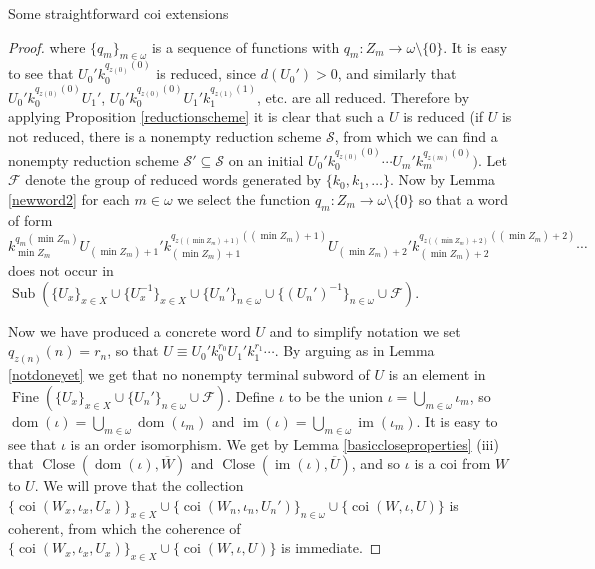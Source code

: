 \documentclass{amsart}
\theoremstyle{definition}\newtheorem{theorem}{Theorem}
\theoremstyle{definition}\newtheorem*{A}{Main Theorem}
\theoremstyle{definition}\newtheorem*{B}{Theorem \ref{elementaryequiv}}
\theoremstyle{definition}\newtheorem*{C}{Theorem \ref{continuous}}
\theoremstyle{definition}\newtheorem*{D}{Theorem \ref{bigisomorphism2}}
\theoremstyle{definition}\newtheorem{bigtheorem}{Main Theorem}
\numberwithin{theorem}{section}
\theoremstyle{definition}\newtheorem{corollary}[theorem]{Corollary}
\theoremstyle{definition}\newtheorem{proposition}[theorem]{Proposition}
\theoremstyle{definition}\newtheorem{definition}[theorem]{Definition}
\theoremstyle{definition}\newtheorem{question}[theorem]{Question}
\theoremstyle{definition}\newtheorem{example}[theorem]{Example}
\theoremstyle{definition}\newtheorem{remark}[theorem]{Remark}
\theoremstyle{definition}\newtheorem{note}[theorem]{Note}
\theoremstyle{definition}\newtheorem{lemma}[theorem]{Lemma}
\theoremstyle{definition}\newtheorem{fact}[theorem]{Fact}
\theoremstyle{definition}\newtheorem{define}[theorem]{Definition}
\theoremstyle{definition}\newtheorem{claim}[theorem]{Claim}
\theoremstyle{definition}\newtheorem{obs}[theorem]{Observation}
\theoremstyle{definition}\newtheorem{definitions}[theorem]{Definitions}
\newcommand{\im}{\operatorname{im}}
\newcommand{\Sub}{\operatorname{Sub}}
\newcommand{\Fine}{\operatorname{Fine}}
\newcommand{\Close}{\operatorname{Close}}
\newcommand{\coi}{\operatorname{coi}}
\newcommand{\dom}{\operatorname{dom}}
\begin{document}
\begin{section}{Some straightforward coi extensions}
\begin{proof}
\noindent where $\{q_m\}_{m\in \omega}$ is a sequence of functions with $q_m: Z_m \rightarrow \omega \setminus\{0\}$.  It is easy to see that $U_0'k_0^{q_{z(0)}(0)}$ is reduced, since $d(U_0') > 0$, and similarly that $U_0'k_0^{q_{z(0)}(0)} U_1'$, $U_0'k_0^{q_{z(0)}(0)} U_1'k_1^{q_{z(1)}(1)}$, etc. are all reduced.  Therefore by applying Proposition \ref{reductionscheme} it is clear that such a $U$ is reduced (if $U$ is not reduced, there is a nonempty reduction scheme $\mathcal{S}$, from which we can find a nonempty reduction scheme $\mathcal{S}' \subseteq \mathcal{S}$ on an initial $U_0'k_0^{q_{z(0)}(0)}\cdots U_m'k_m^{q_{z(m)}(0)})$.  Let $\mathcal{F}$ denote the group of reduced words generated by $\{k_0, k_1, \ldots\}$.  Now by Lemma \ref{newword2} for each $m\in \omega$ we select the function $q_m: Z_m \rightarrow \omega \setminus \{0\}$ so that a word of form $$k_{\min Z_m}^{q_m(\min Z_m)}U_{(\min Z_m) + 1}'k_{(\min Z_m) + 1}^{q_{z((\min Z_m) +1)}((\min Z_m) + 1)}U_{(\min Z_m) + 2}'k_{(\min Z_m) + 2}^{q_{z((\min Z_m) + 2)}((\min Z_m) + 2)}\cdots$$ does not occur in $\Sub(\{U_x\}_{x \in X} \cup \{U_x^{-1}\}_{x \in X} \cup \{U_n'\}_{n \in \omega} \cup \{(U_n')^{-1}\}_{n \in \omega} \cup \mathcal{F})$.

Now we have produced a concrete word $U$ and to simplify notation we set $q_{z(n)}(n) = r_n$, so that $U \equiv U_0'k_0^{r_0}U_1'k_1^{r_1}\cdots$.  By arguing as in Lemma \ref{notdoneyet} we get that no nonempty terminal subword of $U$ is an element in $\Fine(\{U_x\}_{x\in X} \cup \{U_n'\}_{n \in \omega} \cup \mathcal{F})$.  Define $\iota$ to be the union $\iota = \bigcup_{m \in \omega}\iota_m$, so $\dom(\iota) = \bigcup_{m \in \omega}\dom(\iota_m)$ and $\im(\iota) = \bigcup_{m \in \omega}\im(\iota_m)$.  It is easy to see that $\iota$ is an order isomorphism.  We get by Lemma \ref{basiccloseproperties} (iii) that $\Close(\dom(\iota), \overline{W})$ and $\Close(\im(\iota), \overline{U})$, and so $\iota$ is a coi from $W$ to $U$.  We will prove that the collection $\{\coi(W_x, \iota_x, U_x)\}_{x \in X} \cup \{\coi(W_n, \iota_n, U_n')\}_{n \in \omega} \cup \{\coi(W, \iota, U)\}$ is coherent, from which the coherence of $\{\coi(W_x, \iota_x, U_x)\}_{x \in X} \cup \{\coi(W, \iota, U)\}$ is immediate.


\end{proof}
\end{section}
\end{document}

